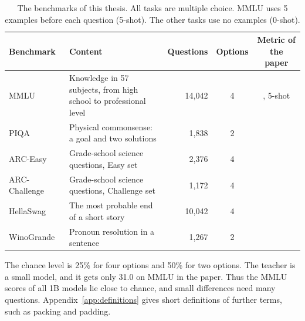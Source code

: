 \begin{table}[ht]
\centering
\small
\caption[The benchmarks of this thesis]{The benchmarks of this thesis. All tasks are multiple choice. MMLU uses 5 examples before each question (5-shot). The other tasks use no examples (0-shot).}
\label{tab:benchmarks}
\begin{tabularx}{\linewidth}{@{}lLrcc@{}}
\toprule
Benchmark & Content & Questions & Options & Metric of the paper \\
\midrule
MMLU~\cite{mmlu} & Knowledge in 57 subjects, from high school to professional level & 14,042 & 4 & , 5-shot \\
PIQA~\cite{piqa} & Physical commonsense: a goal and two solutions & 1,838 & 2 &  \\
ARC-Easy~\cite{arc} & Grade-school science questions, Easy set & 2,376 & 4 &  \\
ARC-Challenge~\cite{arc} & Grade-school science questions, Challenge set & 1,172 & 4 &  \\
HellaSwag~\cite{hellaswag} & The most probable end of a short story & 10,042 & 4 &  \\
WinoGrande~\cite{winogrande} & Pronoun resolution in a sentence & 1,267 & 2 &  \\
\bottomrule
\end{tabularx}
\end{table}

The chance level is 25\% for four options and 50\% for two options. The teacher is a small model, and it gets only 31.0 on MMLU in the paper. Thus the MMLU scores of all 1B models lie close to chance, and small differences need many questions. Appendix~\ref{app:definitions} gives short definitions of further terms, such as packing and padding.
